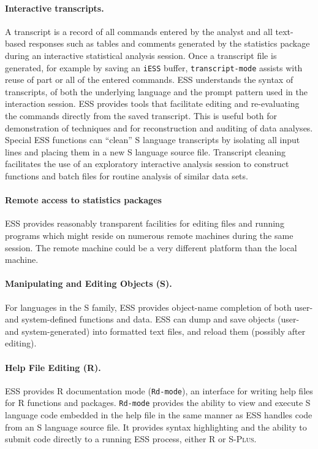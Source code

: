 \documentclass{article}
\newcommand*{\Splus}{\textsc{S-Plus}}
\newcommand{\stexttt}[1]{{\small\texttt{#1}}}
\begin{document}
\paragraph{Interactive transcripts.}
A transcript is a record of all commands entered by the analyst and
all text-based responses such as tables and comments generated by the
statistics package during an interactive statistical analysis session.
Once a transcript file is generated, for example by saving an
\stexttt{iESS} buffer, \stexttt{transcript-mode} assists with reuse of
part or all of the entered commands.  ESS understands the syntax of
transcripts, of both the underlying language and the prompt pattern used
in the interaction session.  ESS provides tools
that facilitate editing
and re-evaluating the commands directly from the saved transcript.
This is useful both for demonstration of techniques and for
reconstruction and auditing of data analyses.  Special ESS functions
can ``clean'' S language transcripts by isolating all input lines and
placing them in a new S language source file.  Transcript cleaning
facilitates the use of an exploratory interactive analysis session to
construct functions and batch files for routine analysis of similar data
sets.

\paragraph{Remote access to statistics packages}
ESS provides reasonably transparent facilities for editing files and
running programs which might reside on numerous remote machines during the
same session.  The remote machine could be a very different platform
than the local machine.

\paragraph{Manipulating and Editing Objects (S).}
For languages in the S family, ESS provides object-name completion of
both user- and system-defined functions and data.  ESS can dump and
save objects (user- and system-generated) into formatted text files,
and reload them (possibly after editing).

\paragraph{Help File Editing (R).}
ESS provides R documentation mode (\stexttt{Rd-mode}), an interface
for writing help files for R functions and packages.
\stexttt{Rd-mode} provides the ability to view and execute S language
code embedded in the help file in the same manner as ESS handles code
from an S language source file.  It provides syntax highlighting and
the ability to submit code directly to a running ESS process, either R
or \Splus.
\end{document}
